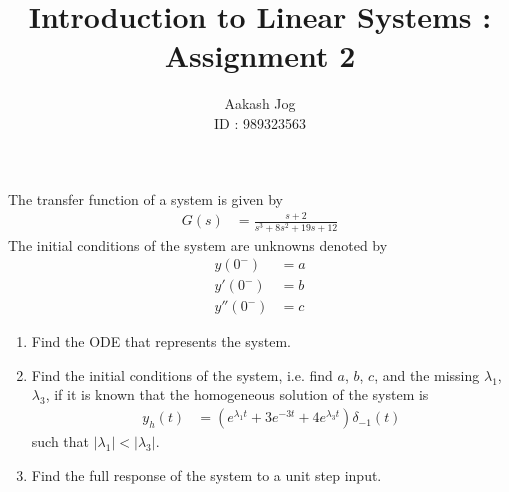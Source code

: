 \documentclass[fleqn, a4paper, 11pt, oneside]{amsart}
\title{Introduction to Linear Systems : Assignment 2}
\author
{
	Aakash Jog\\
	ID : 989323563
}
\date{\formatdate{29}{10}{2015}}
\theoremstyle{definition}
\theoremstyle{theorem}
\begin{document}

\maketitle

\begin{question}
	The transfer function of a system is given by
	\begin{align*}
		G(s) & = \frac{s + 2}{s^3 + 8 s^2 + 19 s + 12}
	\end{align*}
	The initial conditions of the system are unknowns denoted by
	\begin{align*}
		y(0^-)   & = a \\
		y'(0^-)  & = b \\
		y''(0^-) & = c
	\end{align*}
	\begin{enumerate}
		\item
			Find the ODE that represents the system.
		\item
			Find the initial conditions of the system, i.e. find $a$, $b$, $c$, and the missing $\lambda_1$, $\lambda_3$, if it is known that the homogeneous solution of the system is
			\begin{align*}
				y_h(t) & = \left( e^{\lambda_1 t} + 3 e^{-3 t} + 4 e^{\lambda_3 t} \right) \delta_{-1}(t)
			\end{align*}
			such that $|\lambda_1| < |\lambda_3|$.
		\item
			Find the full response of the system to a unit step input.
	\end{enumerate}
\end{question}
\end{document}
